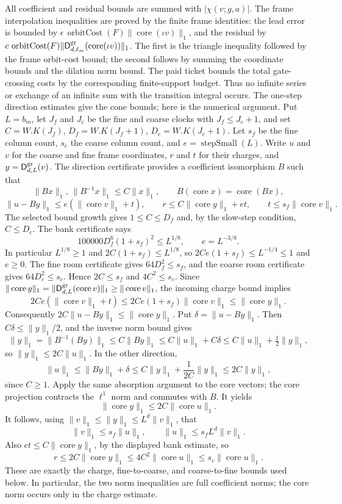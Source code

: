 All coefficient and residual bounds are summed with $|\chi(v;g,a)|$. The frame interpolation inequalities are proved by the finite frame identities: the lead error is bounded by $\epsilon\,\operatorname{orbitCost}(F)\|\operatorname{core}(\iota v)\|_1$, and the residual by $c\,\operatorname{orbitCost}(F)\|\mathsf D^{\rm gr}_{d,\ell_m}(\operatorname{core}(\iota v))\|_1$. The first is the triangle inequality followed by the frame orbit-cost bound; the second follows by summing the coordinate bounds and the dilation norm bound. The paid ticket bounds the total gate-crossing costs by the corresponding finite-support budget. Thus no infinite series or exchange of an infinite sum with the transition integral occurs.
The one-step direction estimates give the cone bounds; here is the numerical argument. Put $L=b_m$, let $J_f$ and $J_c$ be the fine and coarse clocks with $J_f\leq J_c+1$, and set $C=W.K(J_f)$, $D_f=W.K(J_f+1)$, $D_c=W.K(J_c+1)$. Let $s_f$ be the fine column count, $s_c$ the coarse column count, and $e=\operatorname{stepSmall}(L)$. Write $u$ and $v$ for the coarse and fine frame coordinates, $r$ and $t$ for their charges, and $y=\mathsf D^{\rm gr}_{d,L}(v)$. The direction certificate provides a coefficient isomorphism $B$ such that
\[
 \|Bx\|_1,\ \|B^{-1}x\|_1\leq C\|x\|_1,
 \qquad B(\operatorname{core}x)=\operatorname{core}(Bx),
\]
\[
 \|u-By\|_1\leq e(\|\operatorname{core}v\|_1+t),
 \qquad r\leq C\|\operatorname{core}y\|_1+et,
 \qquad t\leq s_f\|\operatorname{core}v\|_1.
\]
The selected bound growth gives $1\leq C\leq D_f$ and, by the slow-step condition, $C\leq D_c$. The bank certificate says
\[
 100000D_f^6(1+s_f)^2\leq L^{1/8},\qquad
 e=L^{-3/8}.
\]
In particular $L^{1/8}\geq1$ and $2C(1+s_f)\leq L^{1/8}$, so $2Ce(1+s_f)\leq L^{-1/4}\leq1$ and $e\geq0$. The fine room certificate gives $64D_f^2\leq s_f$, and the coarse room certificate gives $64D_c^2\leq s_c$. Hence $2C\leq s_f$ and $4C^2\leq s_c$. Since $\|\operatorname{core}y\|_1=\|\mathsf D^{\rm gr}_{d,L}(\operatorname{core}v)\|_1\geq\|\operatorname{core}v\|_1$, the incoming charge bound implies
\[
 2Ce(\|\operatorname{core}v\|_1+t)
 \leq 2Ce(1+s_f)\|\operatorname{core}v\|_1
 \leq \|\operatorname{core}y\|_1.
\]
Consequently $2C\|u-By\|_1\leq\|\operatorname{core}y\|_1$. Put $\delta=\|u-By\|_1$. Then $C\delta\leq\|y\|_1/2$, and the inverse norm bound gives
\[
 \|y\|_1=\|B^{-1}(By)\|_1
 \leq C\|By\|_1
 \leq C\|u\|_1+C\delta
 \leq C\|u\|_1+\tfrac12\|y\|_1,
\]
so $\|y\|_1\leq2C\|u\|_1$. In the other direction,
\[
 \|u\|_1\leq\|By\|_1+\delta
 \leq C\|y\|_1+\frac{1}{2C}\|y\|_1
 \leq2C\|y\|_1,
\]
since $C\geq1$. Apply the same absorption argument to the core vectors; the core projection contracts the $\ell^1$ norm and commutes with $B$. It yields
\[
 \|\operatorname{core}y\|_1\leq2C\|\operatorname{core}u\|_1.
\]
It follows, using $\|v\|_1\leq\|y\|_1\leq L^d\|v\|_1$, that
\[
 \|v\|_1\leq s_f\|u\|_1,\qquad
 \|u\|_1\leq s_f L^d\|v\|_1.
\]
Also $et\leq C\|\operatorname{core}y\|_1$, by the displayed bank estimate, so
\[
 r\leq2C\|\operatorname{core}y\|_1
   \leq4C^2\|\operatorname{core}u\|_1
   \leq s_c\|\operatorname{core}u\|_1.
\]
These are exactly the charge, fine-to-coarse, and coarse-to-fine bounds used below. In particular, the two norm inequalities are full coefficient norms; the core norm occurs only in the charge estimate.

